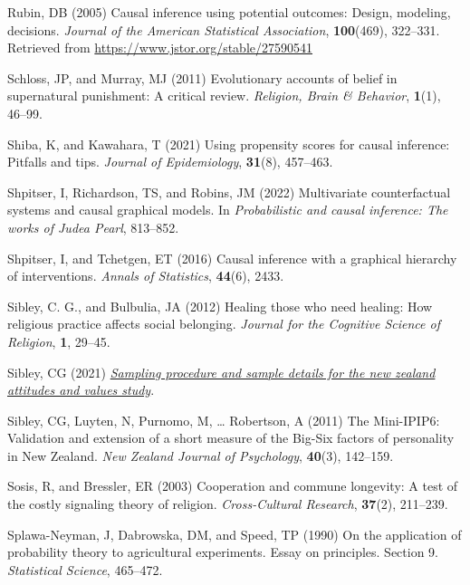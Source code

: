 \documentclass[
  single column]{article}
\newlength{\cslhangindent}
\newenvironment{CSLReferences}[2] %
 {\begin{list}{}{%
  \setlength{\itemindent}{0pt}
  \setlength{\leftmargin}{0pt}
  \setlength{\parsep}{0pt}
  \ifodd #1
   \setlength{\leftmargin}{\cslhangindent}
   \setlength{\itemindent}{-1\cslhangindent}
  \fi
  \setlength{\itemsep}{#2\baselineskip}}}
 {\end{list}}
\begin{document}
\begin{CSLReferences}{1}{0}
Rubin, DB (2005) Causal inference using potential outcomes: Design,
modeling, decisions. \emph{Journal of the American Statistical
Association}, \textbf{100}(469), 322--331. Retrieved from
\url{https://www.jstor.org/stable/27590541}

Schloss, JP, and Murray, MJ (2011) Evolutionary accounts of belief in
supernatural punishment: A critical review. \emph{Religion, Brain \&
Behavior}, \textbf{1}(1), 46--99.

Shiba, K, and Kawahara, T (2021) Using propensity scores for causal
inference: Pitfalls and tips. \emph{Journal of Epidemiology},
\textbf{31}(8), 457--463.

Shpitser, I, Richardson, TS, and Robins, JM (2022) Multivariate
counterfactual systems and causal graphical models. In
\emph{Probabilistic and causal inference: The works of {J}udea {P}earl},
813--852.

Shpitser, I, and Tchetgen, ET (2016) Causal inference with a graphical
hierarchy of interventions. \emph{Annals of Statistics}, \textbf{44}(6),
2433.

Sibley, C. G., and Bulbulia, JA (2012) Healing those who need healing:
How religious practice affects social belonging. \emph{Journal for the
Cognitive Science of Religion}, \textbf{1}, 29--45.

Sibley, CG (2021)
\emph{\href{https://doi.org/10.31234/osf.io/wgqvy}{Sampling procedure
and sample details for the new zealand attitudes and values study}}.

Sibley, CG, Luyten, N, Purnomo, M, \ldots{} Robertson, A (2011) The
Mini-IPIP6: Validation and extension of a short measure of the Big-Six
factors of personality in New Zealand. \emph{New Zealand Journal of
Psychology}, \textbf{40}(3), 142--159.

Sosis, R, and Bressler, ER (2003) Cooperation and commune longevity: A
test of the costly signaling theory of religion. \emph{Cross-Cultural
Research}, \textbf{37}(2), 211--239.

Splawa-Neyman, J, Dabrowska, DM, and Speed, TP (1990) On the application
of probability theory to agricultural experiments. Essay on principles.
Section 9. \emph{Statistical Science}, 465--472.


\end{CSLReferences}
\end{document}
